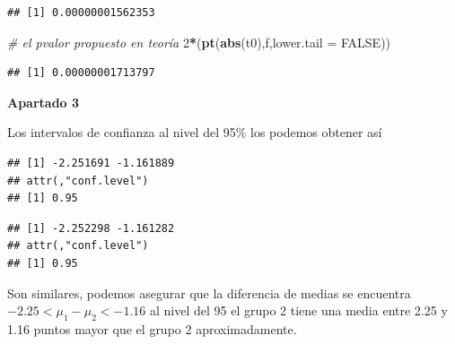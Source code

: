\documentclass[
]{article}
\newenvironment{Shaded}{\begin{snugshade}}{\end{snugshade}}
\newcommand{\CommentTok}[1]{\textcolor[rgb]{0.56,0.35,0.01}{\textit{#1}}}
\newcommand{\DataTypeTok}[1]{\textcolor[rgb]{0.13,0.29,0.53}{#1}}
\newcommand{\DecValTok}[1]{\textcolor[rgb]{0.00,0.00,0.81}{#1}}
\newcommand{\FloatTok}[1]{\textcolor[rgb]{0.00,0.00,0.81}{#1}}
\newcommand{\KeywordTok}[1]{\textcolor[rgb]{0.13,0.29,0.53}{\textbf{#1}}}
\newcommand{\NormalTok}[1]{#1}
\newcommand{\OperatorTok}[1]{\textcolor[rgb]{0.81,0.36,0.00}{\textbf{#1}}}
\newcommand{\OtherTok}[1]{\textcolor[rgb]{0.56,0.35,0.01}{#1}}
\newcommand{\StringTok}[1]{\textcolor[rgb]{0.31,0.60,0.02}{#1}}
\begin{document}
\begin{verbatim}
## [1] 0.00000001562353
\end{verbatim}

\begin{Shaded}
\begin{Highlighting}[]
\CommentTok{\# el pvalor propuesto en teoría}
\DecValTok{2}\OperatorTok{*}\NormalTok{(}\KeywordTok{pt}\NormalTok{(}\KeywordTok{abs}\NormalTok{(t0),f,}\DataTypeTok{lower.tail =} \OtherTok{FALSE}\NormalTok{))}
\end{Highlighting}
\end{Shaded}

\begin{verbatim}
## [1] 0.00000001713797
\end{verbatim}

\textbf{Apartado 3}

Los intervalos de confianza al nivel del 95\% los podemos obtener así

\begin{Shaded}
\end{Shaded}

\begin{verbatim}
## [1] -2.251691 -1.161889
## attr(,"conf.level")
## [1] 0.95
\end{verbatim}

\begin{Shaded}
\end{Shaded}

\begin{verbatim}
## [1] -2.252298 -1.161282
## attr(,"conf.level")
## [1] 0.95
\end{verbatim}

Son similares, podemos asegurar que la diferencia de medias se encuentra
\(-2.25<\mu_1-\mu_2< -1.16\) al nivel del 95 el grupo 2 tiene una media
entre 2.25 y 1.16 puntos mayor que el grupo 2 aproximadamente.
\end{document}

